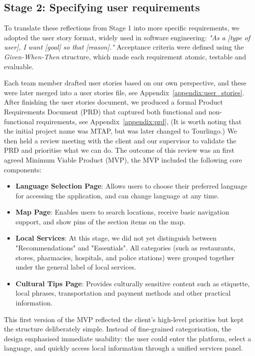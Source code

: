 \subsection{Stage 2: Specifying user requirements} 
To translate these reflections from Stage 1 into more specific requirements, we adopted the user story format, widely used in software engineering: \textit{"As a [type of user], I want [goal] so that [reason]."} \cite{cohn2004userstories}
Acceptance criteria were defined using the \textit{Given-When-Then} \cite{north2006bdd} structure, which made each requirement atomic, testable and evaluable. 

Each team member drafted user stories based on our own perspective, and these were later merged into a user stories file, see Appendix~\ref{appendix:user_stories}. After finishing the user stories document, we produced a formal Product Requirements Document (PRD) that captured both functional and non-functional requirements, see Appendix~\ref{appendix:prd}, (It is worth noting that the initial project name was MTAP, but was later changed to Tourlingo.) We then held a review meeting with the client and our supervisor to validate the PRD and prioritise what we can do. The outcome of this review was an first agreed Minimum Viable Product (MVP), the MVP included the following core components: 
\begin{itemize} \itemsep0pt \parskip0pt
    \item \textbf{Language Selection Page}: Allows users to choose their preferred language for accessing the application, and can change language at any time. 
    \item \textbf{Map Page}: Enables users to search locations, receive basic navigation support, and show pins of the section items on the map. 
    \item \textbf{Local Services}: At this stage, we did not yet distinguish between "Recommendations" and "Essentials". All categories (such as restaurants, stores, pharmacies, hospitals, and police stations) were grouped together under the general label of local services. 
    \item \textbf{Cultural Tips Page}: Provides culturally sensitive content such as etiquette, local phrases, transportation and payment methods and other practical information. 
\end{itemize} 

This first version of the MVP reflected the client’s high-level priorities but kept the structure deliberately simple. Instead of fine-grained categorisation, the design emphasised immediate usability: the user could enter the platform, select a language, and quickly access local information through a unified services panel.

